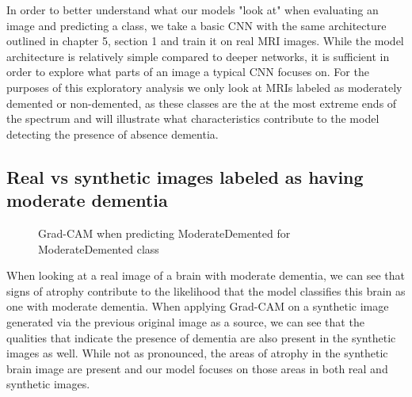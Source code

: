 \documentclass [MAS] {uclathes}
\begin{document}
In order to better understand what our models "look at" when evaluating an image and predicting a class, we take a basic 
CNN with the same architecture outlined in chapter 5, section 1 and train it on real MRI images. While the model 
architecture is relatively simple compared to deeper networks, it is sufficient in order to explore what parts of an 
image a typical CNN focuses on. For the purposes of this exploratory analysis we only look at MRIs labeled as moderately 
demented or non-demented, as these classes are the at the most extreme ends of the spectrum and will illustrate what 
characteristics contribute to the model detecting the presence of absence dementia.

\subsection{Real vs synthetic images labeled as having moderate dementia}

\begin{figure}[H]
    \centering
    \hspace{0.001\textwidth}
    \caption{Grad-CAM when predicting ModerateDemented for ModerateDemented class}
\end{figure}

When looking at a real image of a brain with moderate dementia, we can see that signs of atrophy contribute to the 
likelihood that the model classifies this brain as one with moderate dementia. When applying Grad-CAM on a synthetic 
image generated via the previous original image as a source, we can see that the qualities that indicate the presence of 
dementia are also present in the synthetic images as well. While not as pronounced, the areas of atrophy in the 
synthetic brain image are present and our model focuses on those areas in both real and synthetic images.
\end{document}
